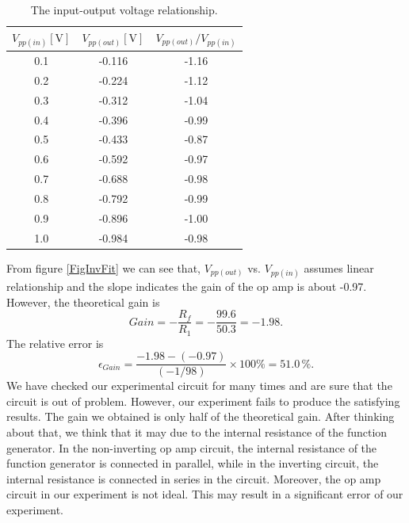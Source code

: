 \documentclass{article}
\begin{document}
\begin{table}[H]
\centering
\begin{tabular}{ccc}
\toprule
$V_{pp(in)}[\text{V}]$ & $V_{pp(out)}[\text{V}]$ & $V_{pp(out)}/V_{pp(in)}$\\
\midrule
0.1 & -0.116 & -1.16\\
0.2 & -0.224 & -1.12\\
0.3 & -0.312 & -1.04\\
0.4 & -0.396 & -0.99\\
0.5 & -0.433 & -0.87\\
0.6 & -0.592 & -0.97\\
0.7 & -0.688 & -0.98\\
0.8 & -0.792 & -0.99\\
0.9 & -0.896 & -1.00\\
1.0 & -0.984 & -0.98\\
\bottomrule
\end{tabular}
\caption{The input-output voltage relationship.}\label{TableV2}
\end{table}


From figure \ref{FigInvFit} we can see that, $V_{pp(out)}$ vs. $V_{pp(in)}$ assumes linear relationship and the slope indicates the gain of the op amp is about -0.97. However, the theoretical gain is 
$$Gain = -\frac{R_f}{R_1} = -\frac{99.6}{50.3} = -1.98.$$
The relative error is 
$$\epsilon_{Gain} = \frac{-1.98-(-0.97)}{(-1/98)}\times 100\% =51.0\,\%.$$
We have checked our experimental circuit for many times and are sure that the circuit is out of problem. However, our experiment fails to produce the satisfying results. The gain we obtained is only half of the theoretical gain. After thinking about that, we think that it may due to the internal resistance of the function generator. In the non-inverting op amp circuit, the internal resistance of the function generator is connected in parallel, while in the inverting circuit, the internal resistance is connected in series in the circuit. Moreover, the op amp circuit in our experiment is not ideal. This may result in a significant error of our experiment.
\end{document}
